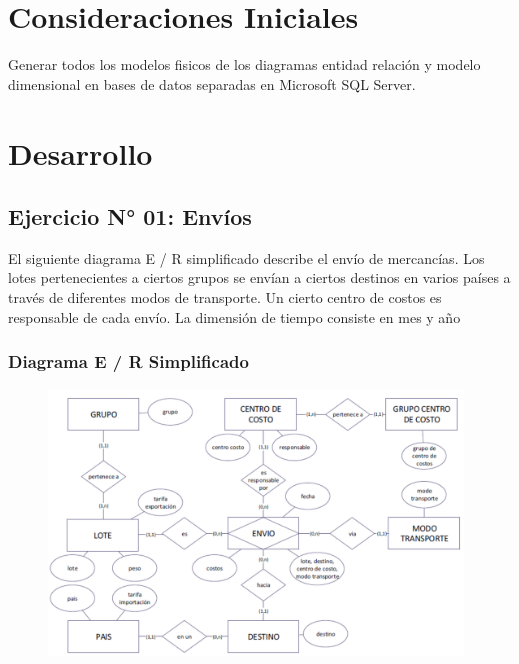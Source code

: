 \documentclass{article}
\begin{document}
\section{Consideraciones Iniciales}
Generar todos los modelos fisicos de los diagramas entidad relación y modelo dimensional en bases de datos separadas en Microsoft SQL Server.

\newpage

\section{Desarrollo}


\subsection{Ejercicio N° 01: Envíos}

El siguiente diagrama E / R simplificado describe el envío de mercancías. Los lotes pertenecientes a ciertos grupos se envían a ciertos destinos en varios países a través de diferentes modos de transporte. Un cierto centro de costos es responsable de cada envío. La dimensión de tiempo consiste en mes y año


\subsubsection{\textbf{Diagrama E / R Simplificado}}

	\begin{figure}[htb]
		\begin{center}
			\includegraphics[width=11cm]{./images/Ejercicio_1}
			
		\end{center}
	\end{figure}
\end{document}
